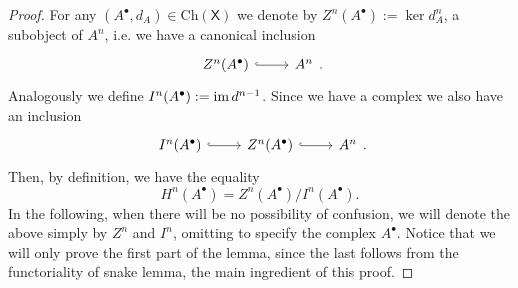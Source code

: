 \documentclass[../Main]{subfiles}
\begin{document}
\begin{proof}
	For any $\left( A^{\bullet}, d_{A} \right) \in \mathrm{Ch}(\mathsf{X})$
	we denote by $Z^n(A^\bullet) := \ker d_A^n$,
	a subobject of $A^n$, i.e. we have a canonical inclusion
	\begin{equation}
	\begin{tikzcd}
		Z^n(A^\bullet) \arrow[r, "", hookrightarrow] &
		A^n
	\end{tikzcd}
	.\end{equation} 
	Analogously we define $I^n(A^\bullet) := \operatorname{im} d^{n-1}$.
	Since we have a complex we also have an inclusion
	\begin{equation}
	\begin{tikzcd}
		I^n(A^\bullet) \arrow[r, "", hookrightarrow] &
		Z^n(A^\bullet) \arrow[r, "", hookrightarrow] &
		A^n
	\end{tikzcd}
	.\end{equation} 
	Then, by definition, we have the equality
	\begin{equation}
		H^{n} \left( A^\bullet \right) = Z^n(A^\bullet)/I^n(A^\bullet)
	.\end{equation} 
	In the following, when there will be no possibility of confusion,
	we will denote the above simply by $Z^n$ and $I^n$, omitting to specify the
	complex $A^\bullet$.
	Notice that we will only prove the first part of the lemma, since the last follows
	from the functoriality of snake lemma, the main ingredient of this proof.


\end{proof}
\end{document}
